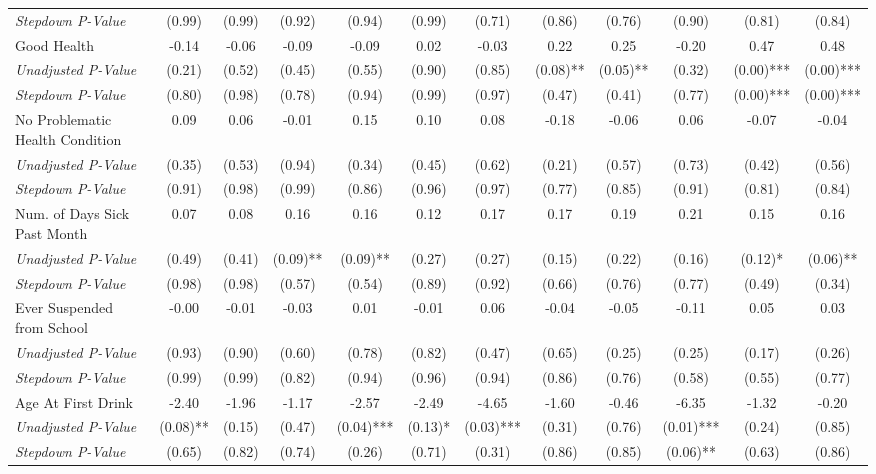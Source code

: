 \begin{tabular}{l c c c c c c c c c c c}
\quad \textit{Stepdown P-Value} & (0.99) & (0.99) & (0.92) & (0.94) & (0.99) & (0.71) & (0.86) & (0.76) & (0.90) & (0.81) & (0.84) \\
Good Health & -0.14 & -0.06 & -0.09 & -0.09 & 0.02 & -0.03 & 0.22 & 0.25 & -0.20 & 0.47 & 0.48 \\
\quad \textit{Unadjusted P-Value} & (0.21) & (0.52) & (0.45) & (0.55) & (0.90) & (0.85) & (0.08)** & (0.05)** & (0.32) & (0.00)*** & (0.00)*** \\
\quad \textit{Stepdown P-Value} & (0.80) & (0.98) & (0.78) & (0.94) & (0.99) & (0.97) & (0.47) & (0.41) & (0.77) & (0.00)*** & (0.00)*** \\
No Problematic Health Condition & 0.09 & 0.06 & -0.01 & 0.15 & 0.10 & 0.08 & -0.18 & -0.06 & 0.06 & -0.07 & -0.04 \\
\quad \textit{Unadjusted P-Value} & (0.35) & (0.53) & (0.94) & (0.34) & (0.45) & (0.62) & (0.21) & (0.57) & (0.73) & (0.42) & (0.56) \\
\quad \textit{Stepdown P-Value} & (0.91) & (0.98) & (0.99) & (0.86) & (0.96) & (0.97) & (0.77) & (0.85) & (0.91) & (0.81) & (0.84) \\
Num. of Days Sick Past Month & 0.07 & 0.08 & 0.16 & 0.16 & 0.12 & 0.17 & 0.17 & 0.19 & 0.21 & 0.15 & 0.16 \\
\quad \textit{Unadjusted P-Value} & (0.49) & (0.41) & (0.09)** & (0.09)** & (0.27) & (0.27) & (0.15) & (0.22) & (0.16) & (0.12)* & (0.06)** \\
\quad \textit{Stepdown P-Value} & (0.98) & (0.98) & (0.57) & (0.54) & (0.89) & (0.92) & (0.66) & (0.76) & (0.77) & (0.49) & (0.34) \\
Ever Suspended from School & -0.00 & -0.01 & -0.03 & 0.01 & -0.01 & 0.06 & -0.04 & -0.05 & -0.11 & 0.05 & 0.03 \\
\quad \textit{Unadjusted P-Value} & (0.93) & (0.90) & (0.60) & (0.78) & (0.82) & (0.47) & (0.65) & (0.25) & (0.25) & (0.17) & (0.26) \\
\quad \textit{Stepdown P-Value} & (0.99) & (0.99) & (0.82) & (0.94) & (0.96) & (0.94) & (0.86) & (0.76) & (0.58) & (0.55) & (0.77) \\
Age At First Drink & -2.40 & -1.96 & -1.17 & -2.57 & -2.49 & -4.65 & -1.60 & -0.46 & -6.35 & -1.32 & -0.20 \\
\quad \textit{Unadjusted P-Value} & (0.08)** & (0.15) & (0.47) & (0.04)*** & (0.13)* & (0.03)*** & (0.31) & (0.76) & (0.01)*** & (0.24) & (0.85) \\
\quad \textit{Stepdown P-Value} & (0.65) & (0.82) & (0.74) & (0.26) & (0.71) & (0.31) & (0.86) & (0.85) & (0.06)** & (0.63) & (0.86) \\
\bottomrule
\end{tabular}
